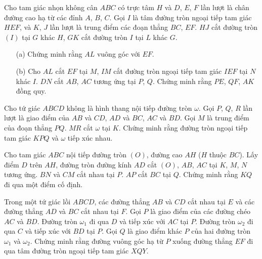        \boom

        \begin{exercise}
            Cho tam giác nhọn không cân \(ABC\) có trực tâm \(H\) và \(D\), \(E\), \(F\) lần lượt là chân đường cao hạ từ các đỉnh \(A\), \(B\), \(C\). Gọi \(I\) là tâm đường tròn ngoại tiếp tam giác \(HEF\), và \(K\), \(J\) lần lượt là trung điểm các đoạn thẳng \(BC\), \(EF\). \(HJ\) cắt đường tròn \((I)\) tại \(G\) khác \(H\), \(GK\) cắt đường tròn \(I\) tại \(L\) khác \(G\).
            \begin{enumerate}
                \item[(a)] Chứng minh rằng \(AL\) vuông góc với \(EF\).
                \item[(b)] Cho \(AL\) cắt \(EF\) tại \(M\), \(IM\) cắt đường tròn ngoại tiếp tam giác \(IEF\) tại \(N\) khác \(I\). \(DN\) cắt \(AB\), \(AC\) tương ứng tại \(P\), \(Q\). Chứng minh rằng \(PE\), \(QF\), \(AK\) đồng quy.
            \end{enumerate}
        \end{exercise}

        \boom

        \begin{exercise}
            Cho tứ giác \(ABCD\) không là hình thang nội tiếp đường tròn \(\omega\). Gọi \(P\), \(Q\), \(R\) lần lượt là giao điểm của \(AB\) và \(CD\), \(AD\) và \(BC\), \(AC\) và \(BD\). Gọi \(M\) là trung điểm của đoạn thẳng \(PQ\). \(MR\) cắt \(\omega\) tại \(K\). Chứng minh rằng đường tròn ngoại tiếp tam giác \(KPQ\) và \(\omega\) tiếp xúc nhau.
        \end{exercise}

        \boom

        \begin{exercise}
            Cho tam giác \(ABC\) nội tiếp đường tròn \((O)\), đường cao \(AH\) (\(H\) thuộc \(BC\)). Lấy điểm \(D\) trên \(AH\), đường tròn đường kính \(AD\) cắt \((O)\), \(AB\), \(AC\) tại \(K\), \(M\), \(N\) tương ứng. \(BN\) và \(CM\) cắt nhau tại \(P\). \(AP\) cắt \(BC\) tại \(Q\). Chứng minh rằng \(KQ\) đi qua một điểm cố định.
        \end{exercise}

        \boom

        \begin{exercise}
            Trong một tứ giác lồi \(ABCD\), các đường thẳng \(AB\) và \(CD\) cắt nhau tại \(E\) và các đường thẳng \(AD\) và \(BC\) cắt nhau tại \(F\). Gọi \(P\) là giao điểm của các đường chéo \(AC\) và \(BD\). Đường tròn \(\omega_1\) đi qua \(D\) và tiếp xúc với \(AC\) tại \(P\). Đường tròn \(\omega_2\) đi qua \(C\) và tiếp xúc với \(BD\) tại \(P\). Gọi \(Q\) là giao điểm khác \(P\) của hai đường tròn \(\omega_1\) và \(\omega_2\). Chứng minh rằng đường vuông góc hạ từ \(P\) xuống đường thẳng \(EF\) đi qua tâm đường tròn ngoại tiếp tam giác \(XQY\).
        \end{exercise}

